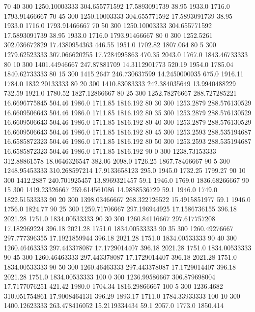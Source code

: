 70  40  300  1250.10003333  304.655771592  17.5893091739  38.95  1933.0  1716.0  1793.91466667 
70  45  300  1250.10003333  304.655771592  17.5893091739  38.95  1933.0  1716.0  1793.91466667 
70  50  300  1250.10003333  304.655771592  17.5893091739  38.95  1933.0  1716.0  1793.91466667 
80  0  300  1252.5261  302.036672829  17.4380954363  446.55  1951.0  1702.82  1807.064 
80  5  300  1279.62523333  307.066620255  17.7284995863  470.35  2043.0  1767.0  1843.46733333 
80  10  300  1401.44946667  247.87881709  14.3112901773  520.19  1954.0  1785.04  1840.62733333 
80  15  300  1415.2647  246.730637599  14.2450000035  675.0  1916.11  1784.0  1832.20133333 
80  20  300  1410.83083333  242.384035649  13.9940488229  732.59  1921.0  1780.52  1827.12866667 
80  25  300  1252.78276667  288.727285221  16.6696775845  504.46  1986.0  1711.85  1816.192 
80  30  300  1253.2879  288.576130529  16.6609506643  504.46  1986.0  1711.85  1816.192 
80  35  300  1253.2879  288.576130529  16.6609506643  504.46  1986.0  1711.85  1816.192 
80  40  300  1253.2879  288.576130529  16.6609506643  504.46  1986.0  1711.85  1816.192 
80  45  300  1253.2593  288.535194687  16.6585872323  504.46  1986.0  1711.85  1816.192 
80  50  300  1253.2593  288.535194687  16.6585872323  504.46  1986.0  1711.85  1816.192 
90  0  300  1238.73153333  312.88861578  18.0646326547  382.06  2098.0  1726.25  1867.78466667 
90  5  300  1248.95453333  310.268597214  17.9133658123  295.0  1945.0  1732.25  1799.27 
90  10  300  1412.2887  240.701925457  13.8969321457  59.1  1946.0  1769.0  1836.68266667 
90  15  300  1419.23326667  259.614561086  14.9888536729  59.1  1946.0  1749.0  1822.51533333 
90  20  300  1398.03466667  268.322126522  15.4915851977  59.1  1946.0  1756.0  1824.77 
90  25  300  1259.71706667  297.196944925  17.1586736155  396.18  2021.28  1751.0  1834.00533333 
90  30  300  1260.84116667  297.617757208  17.182969224  396.18  2021.28  1751.0  1834.00533333 
90  35  300  1260.49276667  297.777396355  17.1921859944  396.18  2021.28  1751.0  1834.00533333 
90  40  300  1260.46463333  297.443378087  17.1729014407  396.18  2021.28  1751.0  1834.00533333 
90  45  300  1260.46463333  297.443378087  17.1729014407  396.18  2021.28  1751.0  1834.00533333 
90  50  300  1260.46463333  297.443378087  17.1729014407  396.18  2021.28  1751.0  1834.00533333 
100  0  300  1236.99586667  306.879698004  17.7177076251  421.42  1980.0  1704.34  1816.29866667 
100  5  300  1236.4682  310.051754861  17.9008464131  396.29  1893.17  1711.0  1784.33933333 
100  10  300  1400.12623333  263.478416052  15.2119334434  59.1  2057.0  1773.0  1850.414 
